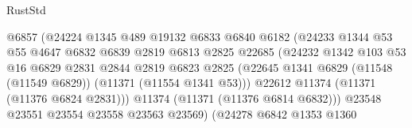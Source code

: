 \begin{lexlean}{RustStd}
\begin{coremodule}
                                        @6857
                                        (@24224
                                          @1345
                                          @489
                                          @19132
                                          @6833
                                          @6840
                                          @6182
                                          (@24233
                                            @1344
                                            @53
                                            @55
                                            @4647
                                            @6832
                                            @6839
                                            @2819
                                            @6813
                                            @2825
                                            @22685
                                            (@24232
                                              @1342
                                              @103
                                              @53
                                              @16
                                              @6829
                                              @2831
                                              @2844
                                              @2819
                                              @6823
                                              @2825
                                              (@22645
                                                @1341
                                                @6829
                                                (@11548 (@11549 @6829))
                                                (@11371 (@11554 @1341 @53)))
                                              @22612
                                              @11374
                                              (@11371 (@11376 @6824 @2831)))
                                            @11374
                                            (@11371 (@11376 @6814 @6832)))
                                          @23548
                                          @23551
                                          @23554
                                          @23558
                                          @23563
                                          @23569)
                                        (@24278
                                          @6842
                                          @1353
                                          @1360

\end{coremodule}
\end{lexlean}
